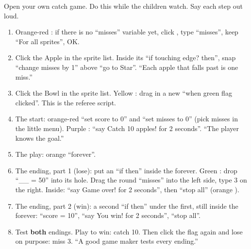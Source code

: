 \begin{workedexample}
Open your own catch game. Do this while the children watch. Say each step out loud.
\begin{enumerate}[leftmargin=1.4em,itemsep=1pt]
  \item Orange-red : if there is no \enquote{misses} variable yet, click , type \enquote{misses}, keep \enquote{For all sprites}, OK.
  \item Click the Apple in the sprite list. Inside its \enquote{if touching edge? then}, snap \enquote{change misses by 1} above \enquote{go to Star}. \enquote{Each apple that falls past is one miss.}
  \item Click the Bowl in the sprite list. Yellow : drag in a new \enquote{when green flag clicked}. This is the referee script.
  \item The start: orange-red  \enquote{set score to 0} and \enquote{set misses to 0} (pick misses in the little menu). Purple : \enquote{say Catch 10 apples! for 2 seconds}. \enquote{The player knows the goal.}
  \item The play: orange  \enquote{forever}.
  \item The ending, part 1 (lose): put an \enquote{if then} inside the forever. Green : drop \enquote{\_\_ = 50} into its hole. Drag the round \enquote{misses} into the left side, type 3 on the right. Inside: \enquote{say Game over! for 2 seconds}, then \enquote{stop all} (orange ).
  \item The ending, part 2 (win): a second \enquote{if then} under the first, still inside the forever: \enquote{score = 10}, \enquote{say You win! for 2 seconds}, \enquote{stop all}.
  \item Test \textbf{both} endings. Play to win: catch 10. Then click the flag again and lose on purpose: miss 3. \enquote{A good game maker tests every ending.}
\end{enumerate}
\begin{center}
\begin{scratch}[scale=0.85]
\end{scratch}
\end{center}
\end{workedexample}


